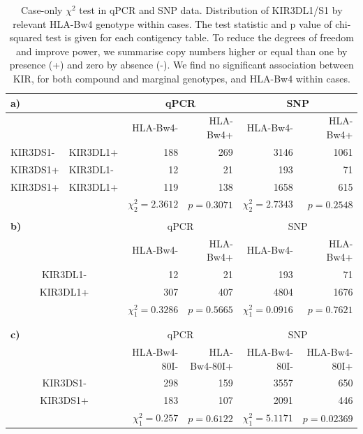 \begin{table}[h]
\centering
\begin{tabularx}{\textwidth}{llrr|rr}
  \multicolumn{2}{l}{\bf{a)}} & \multicolumn{2}{c}{qPCR} & \multicolumn{2}{c}{SNP} \\
  \hline
  & & HLA-Bw4- & HLA-Bw4+ & HLA-Bw4- & HLA-Bw4+ \\ 
  \hline
  KIR3DS1- & KIR3DL1+ & 188 & 269 & 3146 & 1061 \\ 
  KIR3DS1+ & KIR3DL1- &  12 &  21 & 193 &  71 \\ 
  KIR3DS1+ & KIR3DL1+ & 119 & 138 & 1658 & 615 \\ 
  \hline
  & & $\chi^{2}_{2} = 2.3612$ & $p = 0.3071$ & $\chi^{2}_{2} = 2.7343$ & $p = 0.2548$ \\
  \\
  \multicolumn{2}{l}{\bf{b)}} & \multicolumn{2}{c}{qPCR} & \multicolumn{2}{c}{SNP} \\
  \hline
  & & HLA-Bw4- & HLA-Bw4+ & HLA-Bw4- & HLA-Bw4+ \\ 
  \hline
  \multicolumn{2}{c}{KIR3DL1-} &  12 &  21 & 193 &  71 \\
  \multicolumn{2}{c}{KIR3DL1+} & 307 & 407 & 4804 & 1676 \\
  \hline
  & & $\chi^{2}_{1} = 0.3286$ & $p = 0.5665$ & $\chi^{2}_{1} = 0.0916$ & $p = 0.7621$ \\
  \\
  \\
  \multicolumn{2}{l}{\bf{c)}} & \multicolumn{2}{c}{qPCR} & \multicolumn{2}{c}{SNP} \\
  \hline
  & & HLA-Bw4-80I- & HLA-Bw4-80I+ & HLA-Bw4-80I- & HLA-Bw4-80I+ \\ 
  \hline
  \multicolumn{2}{c}{KIR3DS1-} & 298 & 159 & 3557 & 650 \\ 
  \multicolumn{2}{c}{KIR3DS1+} & 183 & 107 & 2091 & 446 \\ 
  \hline
  & & $\chi^{2}_{1} = 0.257$ & $p = 0.6122$ & $\chi^{2}_{1} = 5.1171$ & $p = 0.02369$ \\
\end{tabularx}
\caption{
    \label{table:kir-hla}
    Case-only $\chi^{2}$ test in qPCR and SNP data.
    Distribution of KIR3DL1/S1 by relevant HLA-Bw4 genotype within cases.
    The test statistic and p value of chi-squared test is given for each contigency table.
    To reduce the degrees of freedom and improve power,
    we summarise copy numbers higher or equal than one by presence (+) and zero by absence (-).
    We find no significant association between KIR, for both compound and marginal genotypes, and HLA-Bw4 within cases.
}
\end{table}



